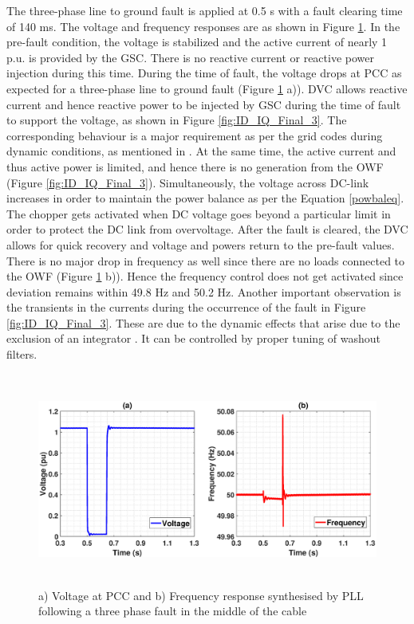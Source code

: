 The three-phase line to ground fault is applied at 0.5 s with a fault clearing time of 140 ms. The voltage and frequency responses are as shown in Figure \ref{fig:Vol_Freq_3phaseSC}. In the pre-fault condition, the voltage is stabilized and the active current of nearly 1 p.u. is provided by the \gls{GSC}. There is no reactive current or reactive power injection during this time. During the time of fault, the voltage drops at \gls{PCC} as expected for a three-phase line to ground fault (Figure \ref{fig:Vol_Freq_3phaseSC} a)). \gls{DVC} allows reactive current and hence reactive power to be injected by \gls{GSC} during the time of fault to support the voltage, as shown in Figure \ref{fig:ID_IQ_Final_3}. The corresponding behaviour is a major requirement as per the grid codes during dynamic conditions, as mentioned in \cite{mohseni_review_2012}. At the same time, the active current and thus active power is limited, and hence there is no generation from the \gls{OWF} (Figure \ref{fig:ID_IQ_Final_3}). Simultaneously, the voltage across DC-link increases in order to maintain the power balance as per the Equation \ref{powbaleq}. The chopper gets activated when \gls{DC} voltage goes beyond a particular limit in order to protect the \gls{DC} link from overvoltage. After the fault is cleared, the \gls{DVC} allows for quick recovery and voltage and powers return to the pre-fault values. There is no major drop in frequency as well since there are no loads connected to the \gls{OWF} (Figure \ref{fig:Vol_Freq_3phaseSC} b)). Hence the frequency control does not get activated since deviation remains within 49.8 Hz and 50.2 Hz. Another important observation is the transients in the currents during the occurrence of the fault in Figure \ref{fig:ID_IQ_Final_3}. These are due to the dynamic effects that arise due to the exclusion of an integrator \cite{korai_dynamic_2019}. It can be controlled by proper tuning of washout filters.

\begin{figure}[H]
    \includegraphics[height = 7cm,width = \textwidth]{Diagrams/Chapter_3/VACP_Freq_Final_3.eps}
    \caption{a) Voltage at PCC and b) Frequency response synthesised by PLL following a three phase fault in the middle of the cable}
    \label{fig:Vol_Freq_3phaseSC}
\end{figure}


